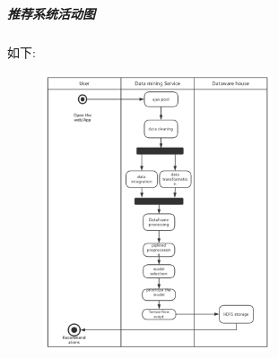 \documentclass[UTF8]{ctexart}
\begin{document}
\subparagraph*{推荐系统活动图}
如下:\\
\begin{figure}[H]
\centering
\includegraphics[width = 0.6\textwidth]{recommend-ac.png}
\end{figure}
\end{document}
